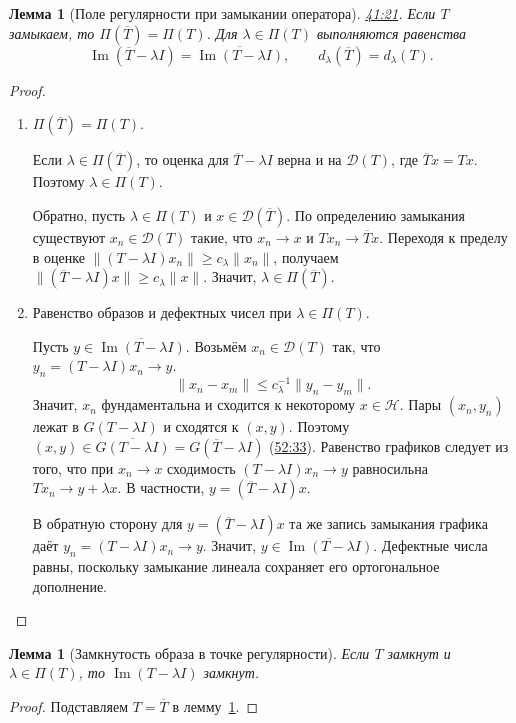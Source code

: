 \documentclass[11pt,a4paper]{article}
\theoremstyle{plain}
\newtheorem{lemma}[theorem]{Лемма}
\theoremstyle{definition}
\newcommand{\Hh}{\mathcal H}
\newcommand{\Dom}{\mathcal D}
\newcommand{\id}{I}
\newcommand{\norm}[1]{\lVert#1\rVert}
\newcommand{\at}[3]{\href{https://www.youtube.com/watch?v=#1&t=#2s}{#3}}
\begin{document}
\begin{lemma}[Поле регулярности при замыкании оператора]
\label{lem:regularity-under-closure}
\at{dRCTK4VqBTk}{2481}{41:21}.
Если $T$ замыкаем, то $\Pi(\overline T)=\Pi(T)$. Для
$\lambda\in\Pi(T)$ выполняются равенства
\[
 \operatorname{Im}(\overline T-\lambda\id)
   =\overline{\operatorname{Im}(T-\lambda\id)},
 \qquad d_\lambda(\overline T)=d_\lambda(T).
\]
\end{lemma}
\begin{proof}
\leavevmode
\begin{enumerate}
\item $\Pi(\overline T)=\Pi(T)$.

Если $\lambda\in\Pi(\overline T)$, то оценка для
$\overline T-\lambda\id$ верна и на $\Dom(T)$, где $\overline T x=Tx$.
Поэтому $\lambda\in\Pi(T)$.

Обратно, пусть $\lambda\in\Pi(T)$ и $x\in\Dom(\overline T)$.
По определению замыкания существуют $x_n\in\Dom(T)$ такие, что
$x_n\to x$ и $Tx_n\to\overline T x$. Переходя к пределу в оценке
$\norm{(T-\lambda\id)x_n}\ge c_\lambda\norm{x_n}$, получаем
$\norm{(\overline T-\lambda\id)x}\ge c_\lambda\norm x$.
Значит, $\lambda\in\Pi(\overline T)$.

\item Равенство образов и дефектных чисел при $\lambda\in\Pi(T)$.

Пусть $y\in\overline{\operatorname{Im}(T-\lambda\id)}$. Возьмём
$x_n\in\Dom(T)$ так, что $y_n=(T-\lambda\id)x_n\to y$.
\[
 \norm{x_n-x_m}\le c_\lambda^{-1}\norm{y_n-y_m}.
\]
Значит, $x_n$ фундаментальна и сходится к некоторому $x\in\Hh$.
Пары $(x_n,y_n)$ лежат в $G(T-\lambda\id)$ и сходятся к $(x,y)$.
Поэтому $(x,y)\in\overline{G(T-\lambda\id)}=G(\overline T-\lambda\id)$
(\at{dRCTK4VqBTk}{3153}{52:33}). Равенство графиков следует из того,
что при $x_n\to x$ сходимость $(T-\lambda\id)x_n\to y$ равносильна
$Tx_n\to y+\lambda x$. В частности, $y=(\overline T-\lambda\id)x$.

В обратную сторону для $y=(\overline T-\lambda\id)x$ та же запись
замыкания графика даёт $y_n=(T-\lambda\id)x_n\to y$.
Значит, $y\in\overline{\operatorname{Im}(T-\lambda\id)}$.
Дефектные числа равны, поскольку замыкание линеала сохраняет его
ортогональное дополнение.
\end{enumerate}
\end{proof}

\begin{lemma}[Замкнутость образа в точке регулярности]
\label{lem:regular-range-closed}
Если $T$ замкнут и $\lambda\in\Pi(T)$, то
$\operatorname{Im}(T-\lambda\id)$ замкнут.
\end{lemma}
\begin{proof}
Подставляем $T=\overline T$ в лемму~\ref{lem:regularity-under-closure}.
\end{proof}
\end{document}
